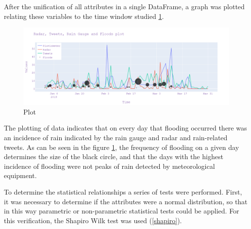 
After the unification of all attributes in a single DataFrame, a graph was plotted relating these variables to the time window studied \ref{fig:graph}.

\begin{figure}[H]
	\centering
	\includegraphics[width=1.2\textwidth]{figs/newplot.png}
	\caption{Plot}
	\label{fig:graph}
\end{figure}

The plotting of data indicates that on every day that flooding occurred there was an incidence of rain indicated by the rain gauge and radar and rain-related tweets. As can be seen in the figure \ref{fig:graph}, the frequency of flooding on a given day determines the size of the black circle, and that the days with the highest incidence of flooding were not peaks of rain detected by meteorological equipment.

To determine the statistical relationships a series of tests were performed. First, it was necessary to determine if the attributes were a normal distribution, so that in this way parametric or non-parametric statistical tests could be applied. For this verification, the Shapiro Wilk test was used (\ref{shapiro}).

